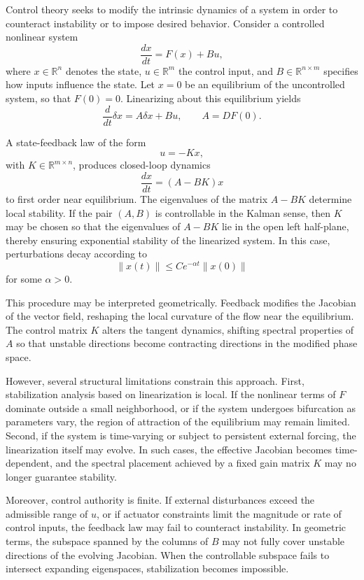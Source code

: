 \documentclass[12pt]{book}
\begin{document}
Control theory seeks to modify the intrinsic dynamics of a system in order to counteract instability or to impose desired behavior. Consider a controlled nonlinear system
\[
\frac{dx}{dt} = F(x) + B u,
\]
where $x \in \mathbb{R}^n$ denotes the state, $u \in \mathbb{R}^m$ the control input, and $B \in \mathbb{R}^{n \times m}$ specifies how inputs influence the state. Let $x=0$ be an equilibrium of the uncontrolled system, so that $F(0)=0$. Linearizing about this equilibrium yields
\[
\frac{d}{dt}\delta x = A \delta x + B u,
\qquad
A = D F(0).
\]

A state-feedback law of the form
\[
u = -K x,
\]
with $K \in \mathbb{R}^{m \times n}$, produces closed-loop dynamics
\[
\frac{dx}{dt} = (A - BK)x
\]
to first order near equilibrium. The eigenvalues of the matrix $A - BK$ determine local stability. If the pair $(A,B)$ is controllable in the Kalman sense, then $K$ may be chosen so that the eigenvalues of $A - BK$ lie in the open left half-plane, thereby ensuring exponential stability of the linearized system. In this case, perturbations decay according to
\[
\|x(t)\| \le C e^{-\alpha t} \|x(0)\|
\]
for some $\alpha > 0$.

This procedure may be interpreted geometrically. Feedback modifies the Jacobian of the vector field, reshaping the local curvature of the flow near the equilibrium. The control matrix $K$ alters the tangent dynamics, shifting spectral properties of $A$ so that unstable directions become contracting directions in the modified phase space.

However, several structural limitations constrain this approach. First, stabilization analysis based on linearization is local. If the nonlinear terms of $F$ dominate outside a small neighborhood, or if the system undergoes bifurcation as parameters vary, the region of attraction of the equilibrium may remain limited. Second, if the system is time-varying or subject to persistent external forcing, the linearization itself may evolve. In such cases, the effective Jacobian becomes time-dependent, and the spectral placement achieved by a fixed gain matrix $K$ may no longer guarantee stability.

Moreover, control authority is finite. If external disturbances exceed the admissible range of $u$, or if actuator constraints limit the magnitude or rate of control inputs, the feedback law may fail to counteract instability. In geometric terms, the subspace spanned by the columns of $B$ may not fully cover unstable directions of the evolving Jacobian. When the controllable subspace fails to intersect expanding eigenspaces, stabilization becomes impossible.
\end{document}
